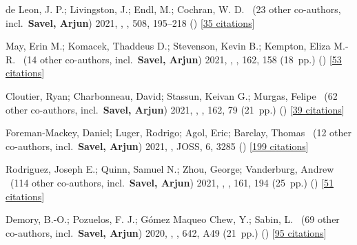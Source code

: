 \item[{\color{numcolor}\scriptsize6}] de Leon, J. P.; Livingston, J.; Endl, M.; Cochran, W. D. \etal{}\ ({23} other co-authors, incl.\ \textbf{Savel, Arjun}) 2021, , \mnras, {508}, 195--218 () [\href{https://ui.adsabs.harvard.edu/abs/2021MNRAS.508..195D}{35 citations}]

\item[{\color{numcolor}\scriptsize5}] May, Erin M.; Komacek, Thaddeus D.; Stevenson, Kevin B.; Kempton, Eliza M.-R. \etal{}\ ({14} other co-authors, incl.\ \textbf{Savel, Arjun}) 2021, , \aj, {162}, 158 (18~pp.) () [\href{https://ui.adsabs.harvard.edu/abs/2021AJ....162..158M}{53 citations}]

\item[{\color{numcolor}\scriptsize4}] Cloutier, Ryan; Charbonneau, David; Stassun, Keivan G.; Murgas, Felipe \etal{}\ ({62} other co-authors, incl.\ \textbf{Savel, Arjun}) 2021, , \aj, {162}, 79 (21~pp.) () [\href{https://ui.adsabs.harvard.edu/abs/2021AJ....162...79C}{39 citations}]

\item[{\color{numcolor}\scriptsize3}] Foreman-Mackey, Daniel; Luger, Rodrigo; Agol, Eric; Barclay, Thomas \etal{}\ ({12} other co-authors, incl.\ \textbf{Savel, Arjun}) 2021, , JOSS, {6}, 3285 () [\href{https://ui.adsabs.harvard.edu/abs/2021JOSS....6.3285F}{199 citations}]

\item[{\color{numcolor}\scriptsize2}] Rodriguez, Joseph E.; Quinn, Samuel N.; Zhou, George; Vanderburg, Andrew \etal{}\ ({114} other co-authors, incl.\ \textbf{Savel, Arjun}) 2021, , \aj, {161}, 194 (25~pp.) () [\href{https://ui.adsabs.harvard.edu/abs/2021AJ....161..194R}{51 citations}]

\item[{\color{numcolor}\scriptsize1}] Demory, B.-O.; Pozuelos, F. J.; G{\'o}mez Maqueo Chew, Y.; Sabin, L. \etal{}\ ({69} other co-authors, incl.\ \textbf{Savel, Arjun}) 2020, , \aanda, {642}, A49 (21~pp.) () [\href{https://ui.adsabs.harvard.edu/abs/2020A&A...642A..49D}{95 citations}]